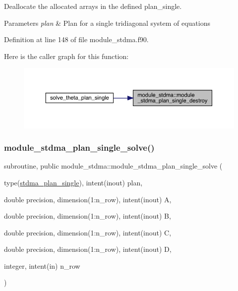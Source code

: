Deallocate the allocated arrays in the defined plan\+\_\+single. 


\begin{DoxyParams}{Parameters}
{\em plan} & Plan for a single tridiagonal system of equations \\
\hline
\end{DoxyParams}


Definition at line 148 of file module\+\_\+stdma.\+f90.

Here is the caller graph for this function\+:\nopagebreak
\begin{figure}[H]
\begin{center}
\leavevmode
\includegraphics[width=350pt]{namespacemodule__stdma_afad99ac77e49d1b335d1a088d9ce0de9_icgraph}
\end{center}
\end{figure}
\mbox{\label{namespacemodule__stdma_a01a73c00d5295d293827efc2b542c9e2}} 
\subsubsection{\texorpdfstring{module\_stdma\_plan\_single\_solve()}{module\_stdma\_plan\_single\_solve()}}
{\footnotesize\ttfamily subroutine, public module\+\_\+stdma\+::module\+\_\+stdma\+\_\+plan\+\_\+single\+\_\+solve (\begin{DoxyParamCaption}\item[{type(\mbox{\hyperlink{structmodule__stdma_1_1stdma__plan__single}{stdma\+\_\+plan\+\_\+single}}), intent(inout)}]{plan,  }\item[{double precision, dimension(1\+:n\+\_\+row), intent(inout)}]{A,  }\item[{double precision, dimension(1\+:n\+\_\+row), intent(inout)}]{B,  }\item[{double precision, dimension(1\+:n\+\_\+row), intent(inout)}]{C,  }\item[{double precision, dimension(1\+:n\+\_\+row), intent(inout)}]{D,  }\item[{integer, intent(in)}]{n\+\_\+row }\end{DoxyParamCaption})}




